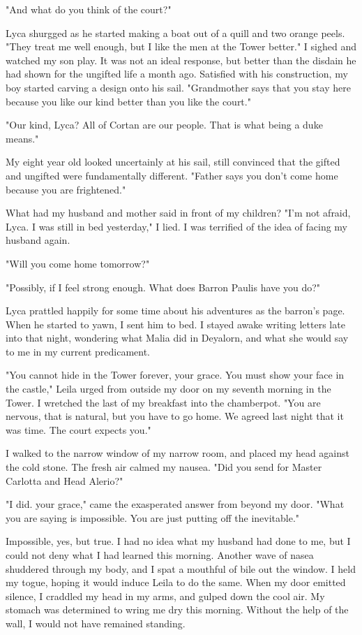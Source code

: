 \documentclass{article}
\begin{document}
"And what do you think of the court?"

Lyca shurgged as he started making a boat out of a quill and two orange peels. "They treat me well enough, but I like the men at the Tower better." I sighed and watched my son play. It was not an ideal response, but better than the disdain he had shown for the ungifted life a month ago. Satisfied with his construction, my boy started carving a design onto his sail. "Grandmother says that you stay here because you like our kind better than you like the court."

"Our kind, Lyca? All of Cortan are our people. That is what being a duke means."

My eight year old looked uncertainly at his sail, still convinced that the gifted and ungifted were fundamentally different. "Father says you don't come home because you are frightened."

What had my husband and mother said in front of my children? "I'm not afraid, Lyca. I was still in bed yesterday," I lied. I was terrified of the idea of facing my husband again. 

"Will you come home tomorrow?"

"Possibly, if I feel strong enough. What does Barron Paulis have you do?" 

Lyca prattled happily for some time about his adventures as the barron's page. When he started to yawn, I sent him to bed. I stayed awake writing letters late into that night, wondering what Malia did in Deyalorn, and what she would say to me in my current predicament.

\vspace{.5cm}

"You cannot hide in the Tower forever, your grace. You must show your face in the castle," Leila urged from outside my door on my seventh morning in the Tower. I wretched the last of my breakfast into the chamberpot. "You are nervous, that is natural, but you have to go home. We agreed last night that it was time. The court expects you."

I walked to the narrow window of my narrow room, and placed my head against the cold stone. The fresh air calmed my nausea. "Did you send for Master Carlotta and Head Alerio?"

"I did. your grace," came the exasperated answer from beyond my door. "What you are saying is impossible. You are just putting off the inevitable."

Impossible, yes, but true. I had no idea what my husband had done to me, but I could not deny what I had learned this morning. Another wave of nasea shuddered through my body, and I spat a mouthful of bile out the window. I held my togue, hoping it would induce Leila to do the same. When my door emitted silence, I craddled my head in my arms, and gulped down the cool air. My stomach was determined to wring me dry this morning. Without the help of the wall, I would not have remained standing.
\end{document}
